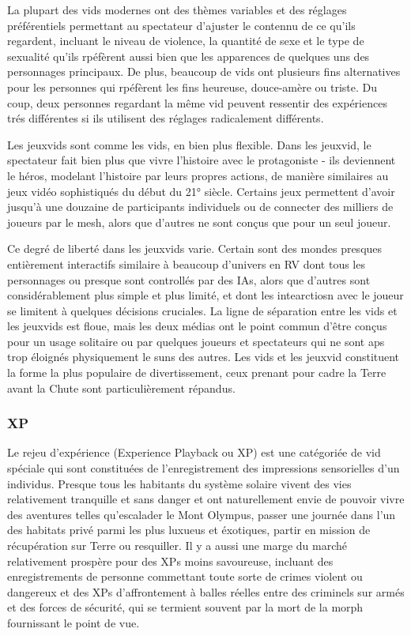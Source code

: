                La plupart des vids modernes ont des thèmes variables et des réglages préférentiels permettant au spectateur d'ajuster le contennu de ce qu'ils regardent, incluant le niveau de violence, la quantité de sexe et le type de sexualité qu'ils rpéfèrent aussi bien que les apparences de quelques uns des personnages principaux. De plus, beaucoup de vids ont plusieurs fins alternatives pour les personnes qui rpéfèrent les fins heureuse, douce-amère ou triste. Du coup, deux personnes regardant la même vid peuvent ressentir des expériences trés différentes si ils utilisent des réglages radicalement différents. 

               Les jeuxvids sont comme les vids, en bien plus flexible. Dans les jeuxvid, le spectateur fait bien plus que vivre l'histoire avec le protagoniste  - ils deviennent le héros, modelant l'histoire par leurs propres actions, de manière similaires au jeux vidéo sophistiqués du début du 21° siècle. Certains jeux permettent d'avoir jusqu'à une douzaine de participants individuels ou de connecter des milliers de joueurs par le mesh, alors que d'autres ne sont conçus que pour un seul joueur. 

               Ce degré de liberté dans les jeuxvids varie. Certain sont des mondes presques entièrement interactifs similaire à beaucoup d'univers en RV dont tous les personnages ou presque sont controllés par des IAs, alors que d'autres sont considérablement plus simple et plus limité, et dont les intearctiosn avec le joueur se limitent à quelques décisions cruciales. La ligne de séparation entre les vids et les jeuxvids est floue, mais les deux médias ont le point commun d'être conçus pour un usage solitaire ou par quelques joueurs et spectateurs qui ne sont aps trop éloignés physiquement le suns des autres. Les vids et les jeuxvid constituent la forme la plus populaire de divertissement, ceux prenant pour cadre la Terre avant la Chute sont particulièrement répandus. 

               \subsubsection{XP} \label{sec:xp} 

               Le rejeu d'expérience (Experience Playback ou XP) est une catégoriée de vid spéciale qui sont constituées de l'enregistrement des impressions sensorielles d'un individus. Presque tous les habitants du système solaire vivent des vies relativement tranquille et sans danger et ont naturellement envie de pouvoir vivre des aventures telles qu'escalader le Mont Olympus, passer une journée dans l'un des habitats privé parmi les plus luxueus et éxotiques, partir en mission de récupération sur Terre ou resquiller. Il y a aussi une marge du marché relativement prospère pour des XPs moins savoureuse, incluant des enregistrements de personne commettant toute sorte de crimes violent ou dangereux et des XPs d'affrontement à balles réelles entre des criminels sur armés et des forces de sécurité, qui se termient souvent par la mort de la morph fournissant le point de vue. 

